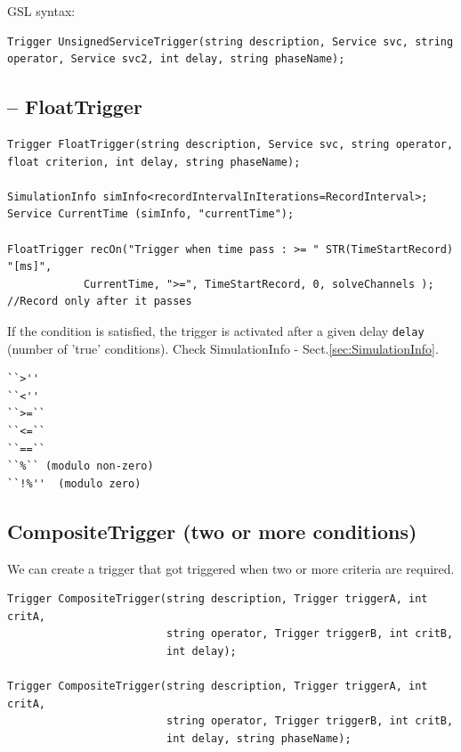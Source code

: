 GSL syntax:
{\tiny
\begin{verbatim}
Trigger UnsignedServiceTrigger(string description, Service svc, string operator, Service svc2, int delay, string phaseName);
\end{verbatim}
}

\subsection{-- FloatTrigger}
\label{sec:FloatTrigger}

{\tiny
\begin{verbatim}
Trigger FloatTrigger(string description, Service svc, string operator, float criterion, int delay, string phaseName);

SimulationInfo simInfo<recordIntervalInIterations=RecordInterval>;
Service CurrentTime (simInfo, "currentTime"); 

FloatTrigger recOn("Trigger when time pass : >= " STR(TimeStartRecord) "[ms]",
            CurrentTime, ">=", TimeStartRecord, 0, solveChannels ); //Record only after it passes

\end{verbatim}
}
If the condition is satisfied, the trigger is activated after a given
delay \verb!delay! (number of 'true' conditions).  Check SimulationInfo -
Sect.\ref{sec:SimulationInfo}.
\begin{verbatim}
``>''
``<''
``>=``
``<=``
``==``
``%`` (modulo non-zero)
``!%''  (modulo zero)
\end{verbatim}


\subsection{CompositeTrigger (two or more conditions)}
\label{sec:CompositeTrigger}

We can create a trigger that got triggered when two or more criteria are
required.

\begin{verbatim}
Trigger CompositeTrigger(string description, Trigger triggerA, int critA, 
                         string operator, Trigger triggerB, int critB, 
                         int delay);

Trigger CompositeTrigger(string description, Trigger triggerA, int critA, 
                         string operator, Trigger triggerB, int critB, 
                         int delay, string phaseName);
\end{verbatim}

